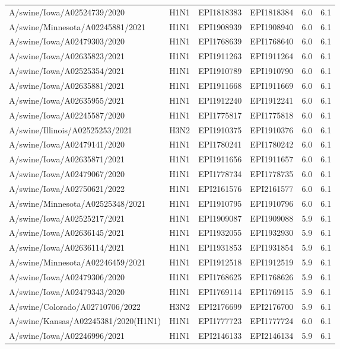 \begin{tabular}{L{1.2in}|L{.3in}|L{.3in}|L{.3in}|L{.3in}|L{.3in}}
A/swine/Iowa/A02524739/2020&H1N1&EPI1818383&EPI1818384&6.0&6.1\\
A/swine/Minnesota/A02245881/2021&H1N1&EPI1908939&EPI1908940&6.0&6.1\\
A/swine/Iowa/A02479303/2020&H1N1&EPI1768639&EPI1768640&6.0&6.1\\
A/swine/Iowa/A02635823/2021&H1N1&EPI1911263&EPI1911264&6.0&6.1\\
A/swine/Iowa/A02525354/2021&H1N1&EPI1910789&EPI1910790&6.0&6.1\\
A/swine/Iowa/A02635881/2021&H1N1&EPI1911668&EPI1911669&6.0&6.1\\
A/swine/Iowa/A02635955/2021&H1N1&EPI1912240&EPI1912241&6.0&6.1\\
A/swine/Iowa/A02245587/2020&H1N1&EPI1775817&EPI1775818&6.0&6.1\\
A/swine/Illinois/A02525253/2021&H3N2&EPI1910375&EPI1910376&6.0&6.1\\
A/swine/Iowa/A02479141/2020&H1N1&EPI1780241&EPI1780242&6.0&6.1\\
A/swine/Iowa/A02635871/2021&H1N1&EPI1911656&EPI1911657&6.0&6.1\\
A/swine/Iowa/A02479067/2020&H1N1&EPI1778734&EPI1778735&6.0&6.1\\
A/swine/Iowa/A02750621/2022&H1N1&EPI2161576&EPI2161577&6.0&6.1\\
A/swine/Minnesota/A02525348/2021&H1N1&EPI1910795&EPI1910796&6.0&6.1\\
A/swine/Iowa/A02525217/2021&H1N1&EPI1909087&EPI1909088&5.9&6.1\\
A/swine/Iowa/A02636145/2021&H1N1&EPI1932055&EPI1932930&5.9&6.1\\
A/swine/Iowa/A02636114/2021&H1N1&EPI1931853&EPI1931854&5.9&6.1\\
A/swine/Minnesota/A02246459/2021&H1N1&EPI1912518&EPI1912519&5.9&6.1\\
A/swine/Iowa/A02479306/2020&H1N1&EPI1768625&EPI1768626&5.9&6.1\\
A/swine/Iowa/A02479343/2020&H1N1&EPI1769114&EPI1769115&5.9&6.1\\
A/swine/Colorado/A02710706/2022&H3N2&EPI2176699&EPI2176700&5.9&6.1\\
A/swine/Kansas/A02245381/2020(H1N1)&H1N1&EPI1777723&EPI1777724&6.0&6.1\\
A/swine/Iowa/A02246996/2021&H1N1&EPI2146133&EPI2146134&5.9&6.1\\
\hline\end{tabular}
